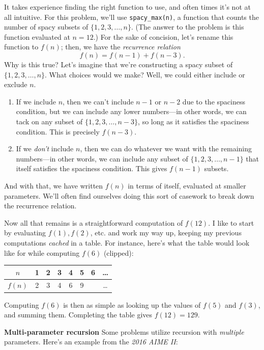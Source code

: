 \documentclass{article}
\begin{document}
It takes experience finding the right function to use, and often times it's not at all intuitive. For this problem, we'll use \texttt{spacy\_max(n)}, a function that counts the number of spacy subsets of $\{1, 2, 3, \dots, n\}$. (The answer to the problem is this function evaluated at $n=12$.) For the sake of concision, let's rename this function to $f(n)$; then, we have the \textit{recurrence relation}
$$f(n) = f(n - 1) + f(n - 3).$$Why is this true? Let's imagine that we're constructing a spacy subset of $\{1, 2, 3, \dots, n\}$. What choices would we make? Well, we could either include or exclude $n$.
\begin{enumerate}
\item If we include $n$, then we can't include $n - 1$ or $n - 2$ due to the spaciness condition, but we can include any lower numbers—in other words, we can tack on any subset of $\{1, 2, 3, \dots, n - 3\}$, so long as it satisfies the spaciness condition. This is precisely $f(n - 3)$.
\item If we \textit{don't} include $n$, then we can do whatever we want with the remaining numbers—in other words, we can include any subset of $\{1, 2, 3, \dots, n - 1\}$ that itself satisfies the spaciness condition. This gives $f(n - 1)$ subsets.
\end{enumerate}
And with that, we have written $f(n)$ in terms of itself, evaluated at smaller parameters. We'll often find ourselves doing this sort of casework to break down the recurrence relation.

Now all that remains is a straightforward computation of $f(12)$. I like to start by evaluating $f(1), f(2)$, etc. and work my way up, keeping my previous computations \textit{cached} in a table. For instance, here's what the table would look like for while computing $f(6)$ (clipped):
\begin{table}
    \centering
    \begin{tabular}{c|c|c|c|c|c|c|c}
         $n$ & 1 & 2 & 3 & 4 & 5 & 6 & \dots \\\hline
         $f(n)$ & 2 & 3 & 4 & 6 & 9 & & \dots
    \end{tabular}
\end{table}
Computing $f(6)$ is then as simple as looking up the values of $f(5)$ and $f(3)$, and summing them. Completing the table gives $f(12) = 129$.

\textbf{Multi-parameter recursion}
Some problems utilize recursion with \textit{multiple} parameters. Here's an example from the \textit{2016 AIME II}:
\end{document}
